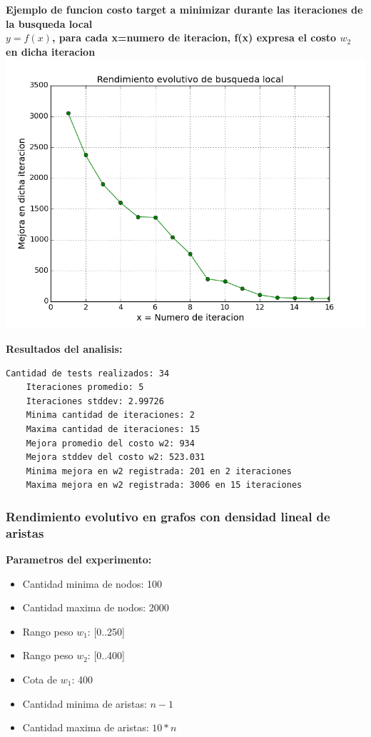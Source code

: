 \begin{center}
	\textbf{Ejemplo de funcion costo target a minimizar durante las iteraciones de la busqueda local}\\
	\textbf{$y = f(x)$, para cada x=numero de iteracion, f(x) expresa el costo $w_2$ en dicha iteracion}\\
	\includegraphics[scale=0.7]{experimentos/bqlocal/rendimiento_evolutivo_absoluto_cliques/bqlocal/instancia_190_11970_in_iters_w2_absolute_value.png}
\end{center}

\vspace{1cm}

\textbf{Resultados del analisis:}
\begin{lstlisting}[frame=single]
	Cantidad de tests realizados: 34	
	Iteraciones promedio: 5	
	Iteraciones stddev: 2.99726	
	Minima cantidad de iteraciones: 2	
	Maxima cantidad de iteraciones: 15	
	Mejora promedio del costo w2: 934	
	Mejora stddev del costo w2: 523.031	
	Minima mejora en w2 registrada: 201 en 2 iteraciones	
	Maxima mejora en w2 registrada: 3006 en 15 iteraciones	
\end{lstlisting}

\subsubsection{Rendimiento evolutivo en grafos con densidad lineal de aristas}

\textbf{Parametros del experimento:}
\begin{itemize}
	\item Cantidad minima de nodos: 100
	\item Cantidad maxima de nodos: 2000
	\item Rango peso $w_1$: [0..250]
	\item Rango peso $w_2$: [0..400]
	\item Cota de $w_1$: 400
	\item Cantidad minima de aristas: $n-1$
	\item Cantidad maxima de aristas: $10*n$
\end{itemize}  

